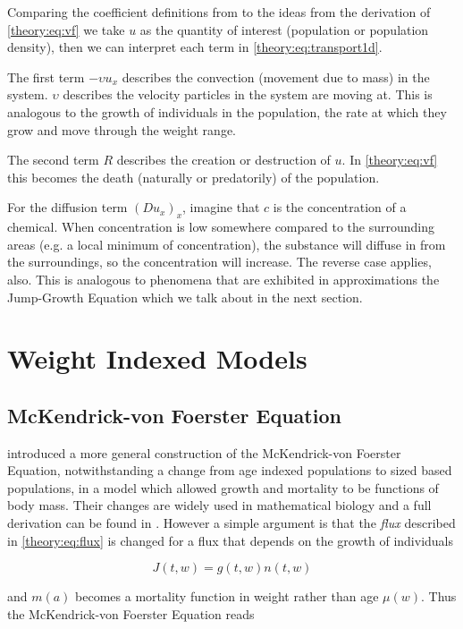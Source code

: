 \documentclass[../main.tex]{subfiles}
\begin{document}
  Comparing the coefficient definitions from \cite{stocker2011} to the ideas from the derivation of \autoref{theory:eq:vf} we take $u$ as the quantity of interest (population or population density), then we can interpret each term in \autoref{theory:eq:transport1d}.

  The first term $-\upsilon u_x$ describes the convection (movement due to mass) in the system. $\upsilon$ describes the velocity particles in the system are moving at. This is analogous to the growth of individuals in the population, the rate at which they grow and move through the weight range.

  The second term $R$ describes the creation or destruction of $u$. In \autoref{theory:eq:vf} this becomes the death (naturally or predatorily) of the population.

  For the diffusion term $(D u_x)_x$, imagine that $c$ is the concentration of a chemical. When concentration is low somewhere compared to the surrounding areas (e.g. a local minimum of concentration), the substance will diffuse in from the surroundings, so the concentration will increase. The reverse case applies, also. This is analogous to phenomena that are exhibited in approximations the Jump-Growth Equation which we talk about in the next section.

  \section{Weight Indexed Models}
  \subsection{McKendrick-von Foerster Equation}\label{theory:sec:mvf}
  \cite{silvert1978} introduced a more general construction of the McKendrick-von Foerster Equation, notwithstanding a change from age indexed populations to sized based populations, in a model which allowed growth and mortality to be functions of body mass. Their changes are widely used in mathematical biology and a full derivation can be found in \cite{silvert1978}. However a simple argument is that the \emph{flux} described in \autoref{theory:eq:flux} is changed for a flux that depends on the growth of individuals

  \begin{equation}
    J(t, w) = g(t, w) n(t, w)
  \end{equation}

  and $m(a)$ becomes a mortality function in weight rather than age $\mu(w)$. Thus the McKendrick-von Foerster Equation reads
\end{document}
